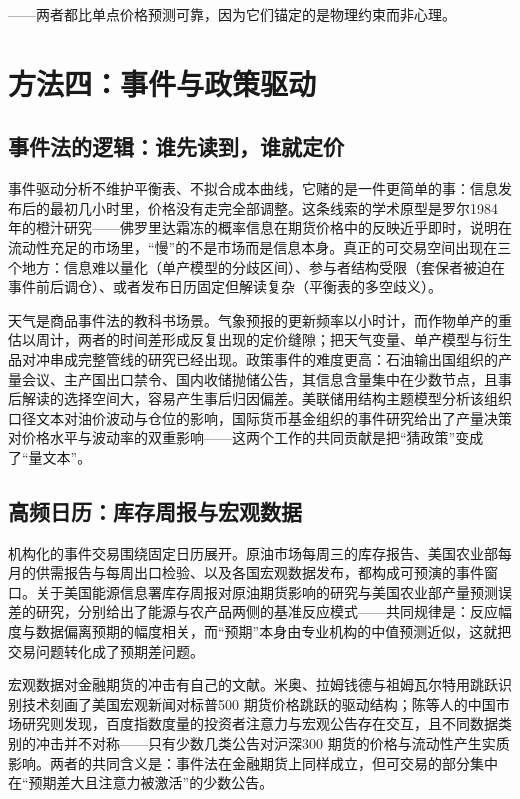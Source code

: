 \documentclass[12pt,a4paper]{ctexart}
\begin{document}
——两者都比单点价格预测可靠，因为它们锚定的是物理约束而非心理。

\section{方法四：事件与政策驱动}

\subsection{事件法的逻辑：谁先读到，谁就定价}

事件驱动分析不维护平衡表、不拟合成本曲线，它赌的是一件更简单的事：信息发布后的最初几小时里，价格没有走完全部调整。这条线索的学术原型是罗尔1984 年的橙汁研究——佛罗里达霜冻的概率信息在期货价格中的反映近乎即时，说明在流动性充足的市场里，“慢”的不是市场而是信息本身\cite{18}。真正的可交易空间出现在三个地方：信息难以量化（单产模型的分歧区间）、参与者结构受限（套保者被迫在事件前后调仓）、或者发布日历固定但解读复杂（平衡表的多空歧义）。

天气是商品事件法的教科书场景。气象预报的更新频率以小时计，而作物单产的重估以周计，两者的时间差形成反复出现的定价缝隙；把天气变量、单产模型与衍生品对冲串成完整管线的研究已经出现\cite{99}。政策事件的难度更高：石油输出国组织的产量会议、主产国出口禁令、国内收储抛储公告，其信息含量集中在少数节点，且事后解读的选择空间大，容易产生事后归因偏差。美联储用结构主题模型分析该组织口径文本对油价波动与仓位的影响\cite{54}，国际货币基金组织的事件研究给出了产量决策对价格水平与波动率的双重影响\cite{52}——这两个工作的共同贡献是把“猜政策”变成了“量文本”。

\subsection{高频日历：库存周报与宏观数据}

机构化的事件交易围绕固定日历展开。原油市场每周三的库存报告、美国农业部每月的供需报告与每周出口检验、以及各国宏观数据发布，都构成可预演的事件窗口。关于美国能源信息署库存周报对原油期货影响的研究与美国农业部产量预测误差的研究，分别给出了能源与农产品两侧的基准反应模式\cite{63, 62}——共同规律是：反应幅度与数据偏离预期的幅度相关，而“预期”本身由专业机构的中值预测近似，这就把交易问题转化成了预期差问题。

宏观数据对金融期货的冲击有自己的文献。米奥、拉姆钱德与祖姆瓦尔特用跳跃识别技术刻画了美国宏观新闻对标普500 期货价格跳跃的驱动结构\cite{79}；陈等人的中国市场研究则发现，百度指数度量的投资者注意力与宏观公告存在交互，且不同数据类别的冲击并不对称——只有少数几类公告对沪深300 期货的价格与流动性产生实质影响\cite{80}。两者的共同含义是：事件法在金融期货上同样成立，但可交易的部分集中在“预期差大且注意力被激活”的少数公告。
\end{document}
